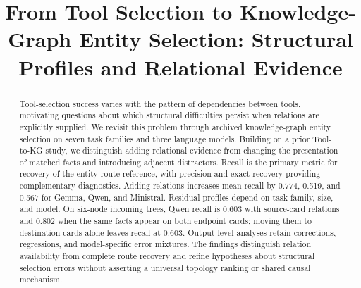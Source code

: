 \documentclass[sigconf,anonymous,review,balance=false]{acmart}
\title[Structural Selection Profiles and Relational Evidence]{From Tool Selection to Knowledge-Graph Entity Selection: Structural Profiles and Relational Evidence}
\begin{document}
\begin{abstract}
Tool-selection success varies with the pattern of dependencies between tools, motivating questions about which structural difficulties persist when relations are explicitly supplied. We revisit this problem through archived knowledge-graph entity selection on seven task families and three language models. Building on a prior Tool-to-KG study, we distinguish adding relational evidence from changing the presentation of matched facts and introducing adjacent distractors. Recall is the primary metric for recovery of the entity-route reference, with precision and exact recovery providing complementary diagnostics. Adding relations increases mean recall by 0.774, 0.519, and 0.567 for Gemma, Qwen, and Ministral. Residual profiles depend on task family, size, and model. On six-node incoming trees, Qwen recall is 0.603 with source-card relations and 0.802 when the same facts appear on both endpoint cards; moving them to destination cards alone leaves recall at 0.603. Output-level analyses retain corrections, regressions, and model-specific error mixtures. The findings distinguish relation availability from complete route recovery and refine hypotheses about structural selection errors without asserting a universal topology ranking or shared causal mechanism.
\end{abstract}
\maketitle







\clearpage


\clearpage

\end{document}

